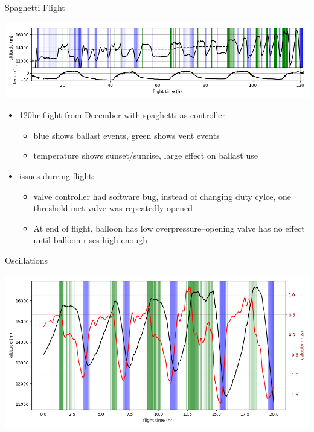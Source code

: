 \documentclass[10pt,mathserif]{beamer}
\begin{document}
\begin{frame}{Spaghetti Flight}
\begin{center}

\includegraphics[width=1\linewidth,trim={10 0 10 0cm},clip]{flight.png}
\begin{itemize}
\item 120hr flight from December with spaghetti as controller 
\begin{itemize}
\item blue shows ballast events, green shows vent events
\item temperature shows sunset/sunrise, large effect on ballast use
\end{itemize}
\item issues durring flight:
\begin{itemize}
\item valve controller had software bug, instead of changing duty cylce, one threshold met valve was repeatedly opened
\item At end of flight, balloon has low overpressure--opening valve has no effect until balloon rises high enough
\end{itemize}
\end{itemize}
\end{center}
\end{frame}


\begin{frame}{Oscillations}

\includegraphics[width=1\linewidth,trim={10 0 10 0cm},clip]{osc.png}
\end{frame}
\end{document}
